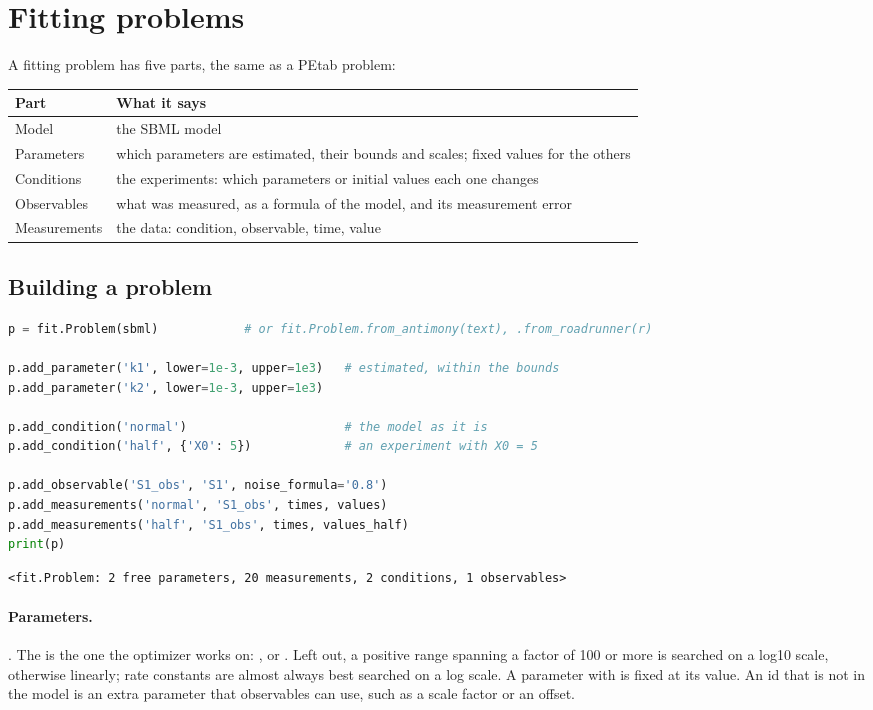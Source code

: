\section{Fitting problems}
\label{sec:problem}

A fitting problem has five parts, the same as a PEtab problem:

\begin{center}
\begin{tabularx}{\textwidth}{lY}
\toprule
Part & What it says \\
\midrule
Model & the SBML model \\
Parameters & which parameters are estimated, their bounds and scales; fixed values for the others \\
Conditions & the experiments: which parameters or initial values each one changes \\
Observables & what was measured, as a formula of the model, and its measurement error \\
Measurements & the data: condition, observable, time, value \\
\bottomrule
\end{tabularx}
\end{center}

\subsection{Building a problem}

\begin{lstlisting}[language=Python]
p = fit.Problem(sbml)            # or fit.Problem.from_antimony(text), .from_roadrunner(r)

p.add_parameter('k1', lower=1e-3, upper=1e3)   # estimated, within the bounds
p.add_parameter('k2', lower=1e-3, upper=1e3)

p.add_condition('normal')                      # the model as it is
p.add_condition('half', {'X0': 5})             # an experiment with X0 = 5

p.add_observable('S1_obs', 'S1', noise_formula='0.8')
p.add_measurements('normal', 'S1_obs', times, values)
p.add_measurements('half', 'S1_obs', times, values_half)
print(p)
\end{lstlisting}
\begin{lstlisting}[style=out]
<fit.Problem: 2 free parameters, 20 measurements, 2 conditions, 1 observables>
\end{lstlisting}

\paragraph{Parameters.} . The
 is the one the optimizer works on: ,  or . Left out, a
positive range spanning a factor of 100 or more is searched on a log10 scale, otherwise linearly; rate constants
are almost always best searched on a log scale. A parameter with  is fixed at its
 value. An id that is not in the model is an extra parameter that observables can use, such as a
scale factor or an offset.

